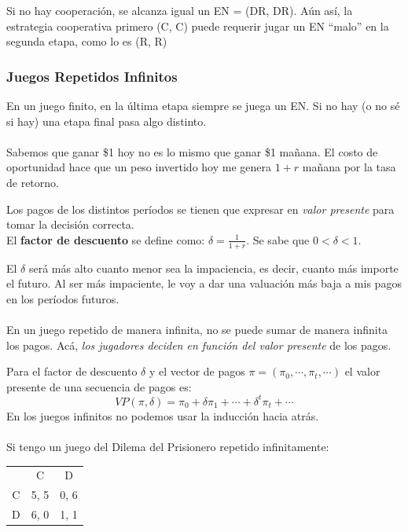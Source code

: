 \documentclass{article}
\begin{document}
                Si no hay cooperación, se alcanza igual un EN = (DR, DR). Aún así, la estrategia cooperativa primero (C, C) puede requerir jugar un EN “malo” en la segunda etapa, como lo es (R, R)
        \subsubsection*{Juegos Repetidos Infinitos}
            En un juego finito, en la última etapa siempre se juega un EN. Si no hay (o no sé si hay) una etapa final pasa algo distinto. \\
            \\
            Sabemos que ganar \$1 hoy no es lo mismo que ganar \$1 mañana. El costo de oportunidad hace que un peso invertido hoy me genera $1+r$ mañana por la tasa de retorno.

            Los pagos de los distintos períodos se tienen que expresar en \emph{valor presente} para tomar la decisión correcta. \\ 
            El \textbf{factor de descuento} se define como: \(\delta = \frac{1}{1+r}\). Se sabe que \(0 < \delta < 1\). 

            El $\delta$ será más alto cuanto menor sea la impaciencia, es decir, cuanto más importe el futuro. Al ser más impaciente, le voy a dar una valuación más baja a mis pagos en los períodos futuros. \\
            \\
            En un juego repetido de manera infinita, no se puede sumar de manera infinita los pagos. Acá, \emph{los jugadores deciden en función del valor presente} de los pagos.

            Para el factor de descuento $\delta$ y el vector de pagos \(\pi = (\pi_{0}, \cdots, \pi_{t}, \cdots)\) el valor presente de una secuencia de pagos es:
            \[VP(\pi, \delta) = \pi_{0} + \delta \pi_{1} + \cdots + \delta^{t}\pi_{t} + \cdots\]
            En los juegos infinitos no podemos usar la inducción hacia atrás. \\
            \\
            Si tengo un juego del Dilema del Prisionero repetido infinitamente:
            \begin{table}[H]
                \centering
                    \begin{tabular}{|c|c|c|}
                          & C    & D    \\
                        C & 5, 5 & 0, 6 \\
                        D & 6, 0 & 1, 1 \\
                    \end{tabular}            
            \end{table}
\end{document}
